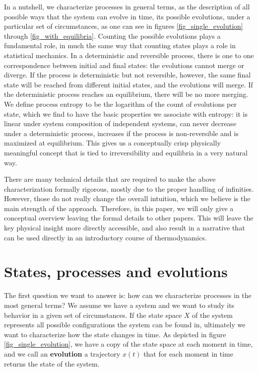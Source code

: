 \documentclass[letterpaper,twocolumn]{article}
\begin{document}
In a nutshell, we characterize processes in general terms, as the description of all possible ways that the system can evolve in time, its possible evolutions, under a particular set of circumstances, as one can see in figures \ref{fig_single_evolution} through \ref{fig_with_equilibria}. Counting the possible evolutions plays a fundamental role, in much the same way that counting states plays a role in statistical mechanics. In a deterministic and reversible process, there is one to one correspondence between initial and final states: the evolutions cannot merge or diverge. If the process is deterministic but not reversible, however, the same final state will be reached from different initial states, and the evolutions will merge. If the deterministic process reaches an equilibrium, there will be no more merging. We define process entropy to be the logarithm of the count of evolutions per state, which we find to have the basic properties we associate with entropy: it is linear under system composition of independent systems, can never decrease under a deterministic process, increases if the process is non-reversible and is maximized at equilibrium. This gives us a conceptually crisp physically meaningful concept that is tied to irreversibility and equilibria in a very natural way.

There are many technical details that are required to make the above characterization formally rigorous, mostly due to the proper handling of infinities. However, those do not really change the overall intuition, which we believe is the main strength of the approach. Therefore, in this paper, we will only give a conceptual overview leaving the formal details to other papers. This will leave the key physical insight more directly accessible, and also result in a narrative that can be used directly in an introductory course of thermodynamics.

\section{States, processes and evolutions}

The first question we want to answer is: how can we characterize processes in the most general terms? We assume we have a system and we want to study its behavior in a given set of circumstances. If the state space $X$ of the system represents all possible configurations the system can be found in, ultimately we want to characterize how the state changes in time. As depicted in figure \ref{fig_single_evolution}, we have a copy of the state space at each moment in time, and we call an \textbf{evolution} a trajectory $x(t)$ that for each moment in time returns the state of the system. 
\end{document}
